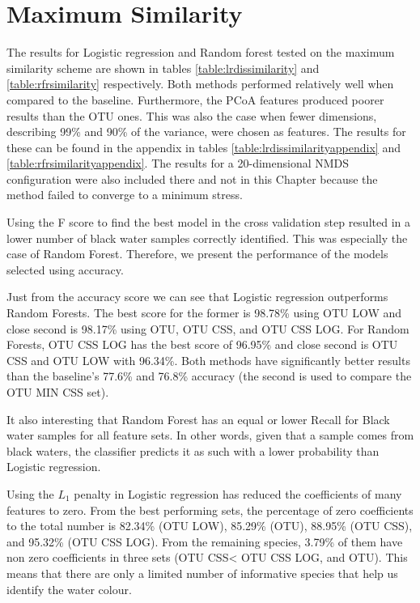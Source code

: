 \section{Maximum Similarity}
The results for Logistic regression and Random forest tested on the maximum similarity scheme are shown in tables \ref{table:lrdissimilarity} and \ref{table:rfrsimilarity} respectively. Both methods performed relatively well when compared to the baseline. Furthermore, the PCoA features produced poorer results than the OTU ones. This was also the case when fewer dimensions, describing 99\% and 90\% of the variance, were chosen as features. The results for these can be found in the appendix in tables \ref{table:lrdissimilarityappendix} and \ref{table:rfrsimilarityappendix}. The results for a 20-dimensional NMDS configuration were also included there and not in this Chapter because the method failed to converge to a minimum stress.

Using the F score to find the best model in the cross validation step resulted in a lower number of black water samples correctly identified. This was especially the case of Random Forest. Therefore, we present the performance of the models selected using accuracy.

Just from the accuracy score we can see that Logistic regression outperforms Random Forests. The best score for the former is 98.78\% using OTU LOW and close second is 98.17\% using OTU, OTU CSS, and OTU CSS LOG. For Random Forests, OTU CSS LOG has the best score of 96.95\% and close second is OTU CSS and OTU LOW with 96.34\%. Both methods have significantly better results than the baseline's 77.6\% and 76.8\% accuracy (the second is used to compare the OTU MIN CSS set).

It also interesting that Random Forest has an equal or lower Recall for Black water samples for all feature sets. In other words, given that a sample comes from black waters, the classifier predicts it as such with a lower probability than Logistic regression. 

Using the $L_1$ penalty in Logistic regression has reduced the coefficients of many features to zero. From the best performing sets, the percentage of zero coefficients to the total number is 82.34\% (OTU LOW), 85.29\% (OTU), 88.95\% (OTU CSS), and 95.32\% (OTU CSS LOG). From the remaining species, 3.79\% of them have non zero coefficients in three sets (OTU CSS< OTU CSS LOG, and OTU). This means that there are only a limited number of informative species that help us identify the water colour. 


